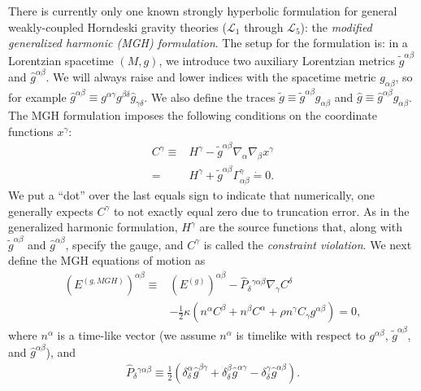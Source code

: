 \documentclass{ws-ijmpd}
\begin{document}
There is currently only one known strongly hyperbolic
formulation for general weakly-coupled Horndeski gravity
theories ($\mathcal{L}_1$ through $\mathcal{L}_5$): the 
\emph{modified generalized harmonic (MGH) 
formulation}\cite{Kovacs:2020pns,Kovacs:2020ywu}.
The setup for the formulation is:
in a Lorentzian spacetime $(M,g)$, we introduce two auxiliary
Lorentzian metrics $\tilde{g}^{\alpha\beta}$ and 
$\hat{g}^{\alpha\beta}$.
We will always raise and lower indices with
the spacetime metric $g_{\alpha\beta}$,
so for example $\hat{g}^{\alpha\beta}\equiv
g^{\alpha\gamma}g^{\beta\delta}\hat{g}_{\gamma\delta}$.
We also define the traces 
$\tilde{g}\equiv \tilde{g}^{\alpha\beta}g_{\alpha\beta}$ and
$\hat{g}\equiv\hat{g}^{\alpha\beta}g_{\alpha\beta}$.
The MGH formulation imposes the following
conditions on the coordinate functions $x^{\gamma}$:
\begin{align}
\label{eq:mh_condition}
   C^{\gamma}
   \equiv&
   H^{\gamma}
   -	
   \tilde{g}^{\alpha\beta}
   \nabla_{\alpha}\nabla_{\beta}x^{\gamma}
   \nonumber\\
   =&
   H^{\gamma}
   +	
   \tilde{g}^{\alpha\beta}\Gamma_{\alpha\beta}^{\gamma}
   \dot{=}
   0
   .
\end{align} 
We put a ``dot'' over the last equals sign to indicate that numerically,
one generally expects $C^{\gamma}$ to not exactly equal zero
due to truncation error.
As in the generalized harmonic 
formulation\cite{Friedrich:1996hq,Garfinkle:2001ni,Pretorius:2004jg},
$H^{\gamma}$ are the source functions that, 
along with $\tilde{g}^{\alpha\beta}$ and $\hat{g}^{\alpha\beta}$,
specify the gauge, and $C^{\gamma}$ 
is called the \emph{constraint violation}.
We next define the MGH equations of motion as 
\begin{align}
\label{eq:basic_mgh_eom}
   \left(E^{(g,MGH)}\right)^{\alpha\beta}
   \equiv
   &
   \left(E^{(g)}\right)^{\alpha\beta}
   -	
   \hat{P}_{\delta}{}^{\gamma\alpha\beta}
   \nabla_{\gamma}C^{\delta}
\nonumber\\
   &
   - 
   \frac{1}{2}\kappa\left(
      n^{\alpha}C^{\beta}
      +	
      n^{\beta}C^{\alpha}
      +	
      \rho n^{\gamma}C_{\gamma} g^{\alpha\beta}
   \right)
   =
   0
   ,
\end{align}
where $n^{\alpha}$ is a time-like vector 
(we assume $n^{\alpha}$ is timelike with respect to $g^{\alpha\beta}$,
$\tilde{g}^{\alpha\beta}$, and 
$\hat{g}^{\alpha\beta}$), and
\begin{align}
   \hat{P}_{\delta}{}^{\gamma\alpha\beta}
   \equiv
   \frac{1}{2}\left(
      \delta_{\delta}^{\alpha}\hat{g}^{\beta\gamma}
      +	
      \delta_{\delta}^{\beta}\hat{g}^{\alpha\gamma}
      -	
      \delta_{\delta}^{\gamma}\hat{g}^{\alpha\beta}
   \right)
   .
\end{align}
\end{document}
